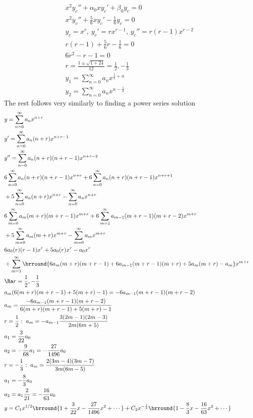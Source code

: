 \begin{align*}
    &x^2y_c''+\alpha_0 x y_c'+\beta_0 y_c=0\\
    &x^2y_c''+\frac{5}{6}xy_c'-\frac{1}{6}y_c=0\\
    &y_c=x^r,\ y_c'=rx^{r-1},\ y_c''=r(r-1)x^{r-2}\\
    &r(r-1)+\frac{5}{6}r-\frac{1}{6}=0\\
    &6r^2-r-1=0\\
    &r=\frac{1\pm\sqrt{1+24}}{12}=\frac{1}{2},-\frac{1}{3}\\
    &y_1=\sum_{n=0}^\infty a_nx^{\frac{1}{2}+n}\\
    &y_2=\sum_{n=0}^\infty a_nx^{n-\frac{1}{3}}
\end{align*}
The rest follows very similarly to finding a power series solution
\begin{align*}
    &y=\sum_{n=0}^\infty a_nx^{n+r}\\
    &y'=\sum_{n=0}^\infty a_n(n+r)x^{n+r-1}\\
    &y''=\sum_{n=0}^\infty a_n(n+r)(n+r-1)x^{n+r-2}\\
    &6\sum_{n=0}^\infty a_n(n+r)(n+r-1)x^{n+r}+6\sum_{n=0}^\infty a_n(n+r)(n+r-1)x^{n+r+1}\\
    &+5\sum_{n=0}^\infty a_n(n+r)x^{n+r}-\sum_{n=0}^\infty a_nx^{n+r}\\
    &6\sum_{m=0}^\infty a_m(m+r)(m+r-1)x^{m+r}+6\sum_{m=1}^\infty a_{m-1}(m+r-1)(m+r-2)x^{m+r}\\
    &+5\sum_{m=0}^\infty a_m(m+r)x^{m+r}-\sum_{m=0}^\infty a_{m}x^{m+r}\\
    &6a_0(r)(r-1)x^r+5a_0(r)x^r-a_0x^r\\
    &+\sum_{m=1}^\infty\brround{6a_m(m+r)(m+r-1)+6a_{m-1}(m+r-1)(m+r)+5a_m(m+r)-a_{m}}x^{m+r}\\
    &\Ra r=\frac{1}{2},-\frac{1}{3}\\
    &a_m(6(m+r)(m+r-1)+5(m+r)-1)=-6a_{m-1}(m+r-1)(m+r-2)\\
    &a_m=\frac{-6a_{m-1}(m+r-1)(m+r-2)}{6(m+r)(m+r-1)+5(m+r)-1}\\
    &r=\frac{1}{2}:\ a_m=-a_{m-1}\frac{3(2m-1)(2m-3)}{2m(6m+5)}\\
    &a_1=\frac{3}{22}a_0\\
    &a_2=-\frac{9}{68}a_1=-\frac{27}{1496}a_0\\
    &r=-\frac{1}{3}:\ a_m=\frac{2(3m-4)(3m-7)}{3m(6m-5)}\\
    &a_1=-\frac{8}{3}a_0\\
    &a_2=a_1\frac{2}{21}=-\frac{16}{63}a_0\\
    &y=C_1x^{1/2}\brround{1+\frac{3}{22}x-\frac{27}{1496}x^2+\cdots}+C_2x^{-\frac{1}{3}}\brround{1-\frac{8}{3}x-\frac{16}{63}x^2+\cdots}
\end{align*}
